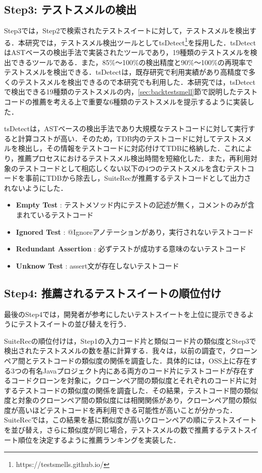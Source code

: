 \documentclass[12pt]{jarticle} %
\begin{document}
\subsection{Step3: テストスメルの検出}

Step3では，Step2で検索されたテストスイートに対して，テストスメルを検出する．本研究では，テストスメル検出ツールとして{\sf tsDetect}\footnote{https://testsmells.github.io/}\cite{Peruma}を採用した．{\sf tsDetect}はASTベースの検出手法で実装されたツールであり，19種類のテストスメルを検出できるツールである．また，85\%〜100\%の検出精度と90\%〜100\%の再現率でテストスメルを検出できる．{\sf tsDetect}は，既存研究で利用実績があり高精度で多くのテストスメルを検出できるので本研究でも利用した．本研究では，{\sf tsDetect}で検出できる19種類のテストスメルの内，\ref{sec:backtestsmell}節で説明したテストコードの推薦を考える上で重要な6種類のテストスメルを提示するように実装した．

{\sf tsDetect}は，ASTベースの検出手法であり大規模なテストコードに対して実行すると計算コストが高い．そのため，TDB内のテストコードに対してテストスメルを検出し，その情報をテストコードに対応付けてTDBに格納した．これにより，推薦プロセスにおけるテストスメル検出時間を短縮化した．また，再利用対象のテストコードとして相応しくない以下の4つのテストスメルを含むテストコードを事前にTDBから除去し，{\sf SuiteRec}が推薦するテストコードとして出力されないようにした．

\begin{itemize}
\item \textbf{Empty Test} : テストメソッド内にテストの記述が無く，コメントのみが含まれているテストコード
\item \textbf{Ignored Test} : @Ignoreアノテーションがあり，実行されないテストコード
\item \textbf{Redundant Assertion} : 必ずテストが成功する意味のないテストコード
\item \textbf{Unknow Test} : assert文が存在しないテストコード
\end{itemize}

\subsection{Step4: 推薦されるテストスイートの順位付け}

最後のStep4では，開発者が参考にしたいテストスイートを上位に提示できるようにテストスイートの並び替えを行う．

{\sf SuiteRec}の順位付けは，Step1の入力コード片と類似コード片の類似度とStep3で検出されたテストスメルの数を基に計算する．我々は，以前の調査\cite{fose2019}で，クローンペア間とテストコードの類似度の関係を調査した．具体的には，OSS上に存在する3つの有名Javaプロジェクト内にある両方のコード片にテストコードが存在するコードクローンを対象に，クローンペア間の類似度とそれぞれのコード片に対するテストコードの類似度の関係を調査した．その結果，テストコード間の類似度と対象のクローンペア間の類似度には相関関係があり，クローンペア間の類似度が高いほどテストコードを再利用できる可能性が高いことが分かった．{\sf SuiteRec}では，この結果を基に類似度が高いクローンペアの順にテストスイートを並び替え，さらに類似度が同じ場合，テストスメルの数で推薦するテストスイート順位を決定するように推薦ランキングを実装した．
\end{document}
